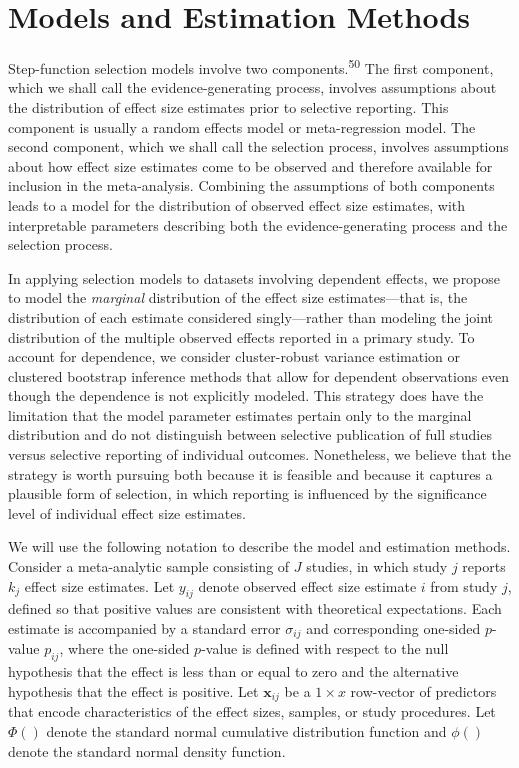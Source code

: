 \documentclass[
  american,
  man, donotrepeattitle,floatsintext]{apa7}
\begin{document}
\section{Models and Estimation Methods}\label{model-and-estimation}

Step-function selection models involve two components.\textsuperscript{50}
The first component, which we shall call the evidence-generating process, involves assumptions about the distribution of effect size estimates prior to selective reporting.
This component is usually a random effects model or meta-regression model.
The second component, which we shall call the selection process, involves assumptions about how effect size estimates come to be observed and therefore available for inclusion in the meta-analysis.
Combining the assumptions of both components leads to a model for the distribution of observed effect size estimates, with interpretable parameters describing both the evidence-generating process and the selection process.

In applying selection models to datasets involving dependent effects, we propose to model the \emph{marginal} distribution of the effect size estimates---that is, the distribution of each estimate considered singly---rather than modeling the joint distribution of the multiple observed effects reported in a primary study.
To account for dependence, we consider cluster-robust variance estimation or clustered bootstrap inference methods that allow for dependent observations even though the dependence is not explicitly modeled.
This strategy does have the limitation that the model parameter estimates pertain only to the marginal distribution and do not distinguish between selective publication of full studies versus selective reporting of individual outcomes.
Nonetheless, we believe that the strategy is worth pursuing both because it is feasible and because it captures a plausible form of selection, in which reporting is influenced by the significance level of individual effect size estimates.

We will use the following notation to describe the model and estimation methods. Consider a meta-analytic sample consisting of \(J\) studies, in which study \(j\) reports \(k_j\) effect size estimates. Let \(y_{ij}\) denote observed effect size estimate \(i\) from study \(j\), defined so that positive values are consistent with theoretical expectations. Each estimate is accompanied by a standard error \(\sigma_{ij}\) and corresponding one-sided \(p\)-value \(p_{ij}\), where the one-sided \(p\)-value is defined with respect to the null hypothesis that the effect is less than or equal to zero and the alternative hypothesis that the effect is positive. Let \(\mathbf{x}_{ij}\) be a \(1 \times x\) row-vector of predictors that encode characteristics of the effect sizes, samples, or study procedures. Let \(\Phi()\) denote the standard normal cumulative distribution function and \(\phi()\) denote the standard normal density function.
\end{document}
